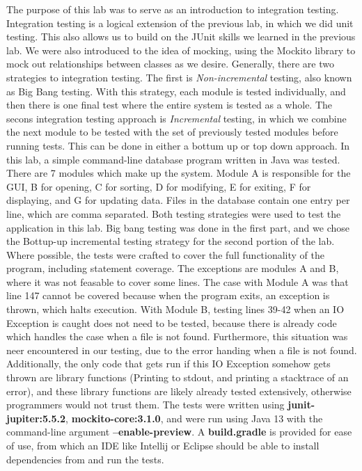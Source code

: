 The purpose of this lab was to serve as an introduction to integration testing.
Integration testing is a logical extension of the previous lab, in which we did
unit testing. This also allows us to build on the JUnit skills we learned in
the previous lab. We were also introduced to the idea of mocking, using the
Mockito library to mock out relationships between classes as we desire.
Generally, there are two strategies to integration testing. The first is
\textit{Non-incremental} testing, also known as Big Bang testing. With this
strategy, each module is tested individually, and then there is one final test
where the entire system is tested as a whole. The secons integration testing
approach is \textit{Incremental} testing, in which we combine the next module
to be tested with the set of previously tested modules before running tests.
This can be done in either a bottum up or top down approach. In this lab, a
simple command-line database program written in Java was tested. There are 7
modules which make up the system.  Module A is responsible for the GUI, B for
opening, C for sorting, D for modifying, E for exiting, F for displaying, and G
for updating data. Files in the database contain one entry per line, which are
comma separated. Both testing strategies were used to test the application in
this lab. Big bang testing was done in the first part, and we chose the
Bottup-up incremental testing strategy for the second portion of the lab. Where
possible, the tests were crafted to cover the full functionality of the
program, including statement coverage. The exceptions are modules A and B,
where it was not feasable to cover some lines.  The case with Module A was that
line 147 cannot be covered because when the program exits, an exception is
thrown, which halts execution. With Module B, testing lines 39-42 when an IO
Exception is caught does not need to be tested, because there is already code
which handles the case when a file is not found.  Furthermore, this situation
was neer encountered in our testing, due to the error handing when a file is
not found. Additionally, the only code that gets run if this IO Exception
somehow gets thrown are library functions (Printing to stdout, and printing a
stacktrace of an error), and these library functions are likely already tested
extensively, otherwise programmers would not trust them.  The tests were
written using \textbf{junit-jupiter:5.5.2}, \textbf{mockito-core:3.1.0}, and
were run using Java 13 with the command-line argument
\textbf{--enable-preview}. A \textbf{build.gradle} is provided for ease of use,
from which an IDE like Intellij or Eclipse should be able to install
dependencies from and run the tests.
